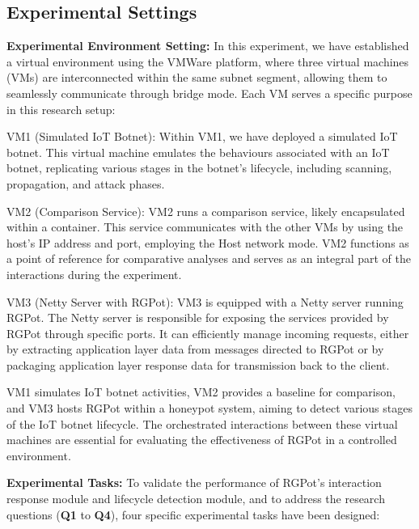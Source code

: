 \documentclass[journal]{IEEEtai}
\begin{document}
\subsection{Experimental Settings}

\textbf{Experimental Environment Setting:}
In this experiment, we have established a virtual environment using the VMWare platform, where three virtual machines (VMs) are interconnected within the same subnet segment, allowing them to seamlessly communicate through bridge mode. 
Each VM serves a specific purpose in this research setup:

VM1 (Simulated IoT Botnet): Within VM1, we have deployed a simulated IoT botnet. 
This virtual machine emulates the behaviours associated with an IoT botnet, replicating various stages in the botnet's lifecycle, including scanning, propagation, and attack phases.

VM2 (Comparison Service): VM2 runs a comparison service, likely encapsulated within a container. 
This service communicates with the other VMs by using the host's IP address and port, employing the Host network mode. 
VM2 functions as a point of reference for comparative analyses and serves as an integral part of the interactions during the experiment.

VM3 (Netty Server with RGPot): VM3 is equipped with a Netty server running RGPot. 
The Netty server is responsible for exposing the services provided by RGPot through specific ports. 
It can efficiently manage incoming requests, either by extracting application layer data from messages directed to RGPot or by packaging application layer response data for transmission back to the client.

VM1 simulates IoT botnet activities, VM2 provides a baseline for comparison, and VM3 hosts RGPot within a honeypot system, aiming to detect various stages of the IoT botnet lifecycle. 
The orchestrated interactions between these virtual machines are essential for evaluating the effectiveness of RGPot in a controlled environment.

\textbf{Experimental Tasks:}
To validate the performance of RGPot's interaction response module and lifecycle detection module, and to address the research questions (\textbf{Q1} to \textbf{Q4}), four specific experimental tasks have been designed:
\end{document}

